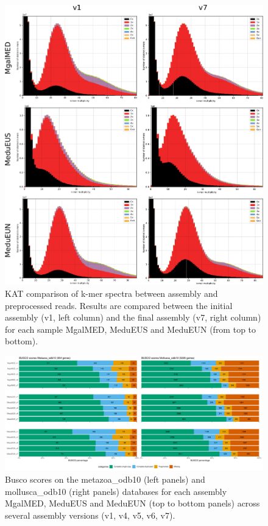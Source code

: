 \documentclass[11pt, a4paper]{article}
\begin{document}
\begin{figure}[h]
	\includegraphics[width=\linewidth]{figures/supfig_kat_spectra.pdf}
	\caption{KAT comparison of k-mer spectra between assembly and preprocessed reads.
	Results are compared between the initial assembly (v1, left column) and the final assembly (v7, right column) for each sample MgalMED, MeduEUS and MeduEUN (from top to bottom).}
	\label{supfig:kat_spectra}
\end{figure}

\begin{figure}[h]
	\includegraphics[width=\linewidth]{figures/supfig_busco.pdf}
	\caption{Busco scores on the metazoa\_odb10 (left panels) and mollusca\_odb10 (right panels) databases for each assembly MgalMED, MeduEUS and MeduEUN (top to bottom panels) across several assembly versions (v1, v4, v5, v6, v7).}
	\label{supfig:busco}
\end{figure}
\end{document}

